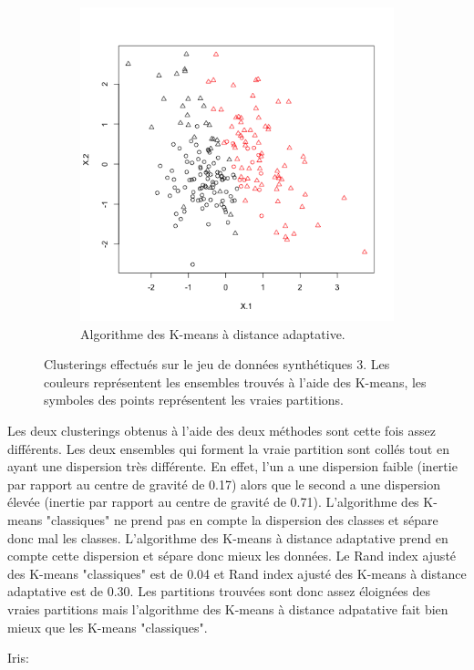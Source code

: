 \documentclass[a4paper,11pt,oneside,roman]{article}
\begin{document}
\begin{figure}
\begin{subfigure}{.5\textwidth}
          \includegraphics[width=.8\linewidth]{imgs/K_means_adapt_synth_3.png}
          \caption{Algorithme des K-means à distance adaptative.}
        \end{subfigure}
        \caption{Clusterings effectués sur le jeu de données synthétiques 3. Les couleurs représentent les ensembles trouvés à l'aide des K-means, les symboles des points représentent les vraies partitions.}
        \label{fig_synth_3}
    \end{figure}
    Les deux clusterings obtenus à l'aide des deux méthodes sont cette fois assez différents.
    Les deux ensembles qui forment la vraie partition sont collés tout en ayant une dispersion très différente.
    En effet, l'un a une dispersion faible (inertie par rapport au centre de gravité de 0.17) alors que le second a une dispersion élevée (inertie par rapport au centre de gravité de 0.71).
    L'algorithme des K-means "classiques" ne prend pas en compte la dispersion des classes et sépare donc mal les classes.
    L'algorithme des K-means à distance adaptative prend en compte cette dispersion et sépare donc mieux les données.
    Le Rand index ajusté des K-means "classiques" est de 0.04 et Rand index ajusté des K-means à distance adaptative est de 0.30.
    Les partitions trouvées sont donc assez éloignées des vraies partitions mais l'algorithme des K-means à distance adpatative fait bien mieux que les K-means "classiques".
    
    Iris:
\end{document}
